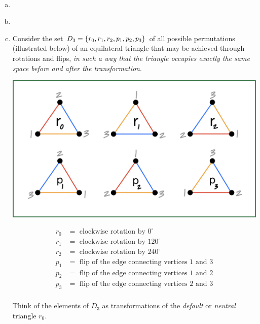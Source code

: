 \documentclass[11pt,fleqn,dvipsnames,usenames]{article}
\newcommand{\p}{\noindent}
\begin{document}
\begin{examples*}~
\begin{enumerate}[(a)]
\item ~
\vspace{3cm}

\item~
\vspace{3cm}

\item Consider the set $D_3 = \left\{r_0,r_1,r_2,p_1,p_2,p_3\right\}$ of all possible permutations (illustrated below) of an equilateral triangle that may be achieved through rotations and flips, \emph{in such a way that the triangle occupies exactly the same space before and after the transformation}.

\begin{multicols}{2}
\begin{center}
\includegraphics[width=1\linewidth]{permutationsoftriangle}
\end{center}
\columnbreak

\begin{align*}
r_0 &= \text{ clockwise rotation by }0^{\circ}\\
r_1 &= \text{ clockwise rotation by }120^{\circ}\\
r_2 &= \text{ clockwise rotation by }240^{\circ}\\
p_1 &= \text{ flip of the edge connecting vertices }1\text{ and }3\\
p_2 &= \text{ flip of the edge connecting vertices }1\text{ and }2\\
p_3 &= \text{ flip of the edge connecting vertices }2\text{ and }3\\
\end{align*}
\end{multicols}

\p Think of the elements of $D_3$ as transformations of the \emph{default} or \emph{neutral} triangle $r_{0}$.
\newpage


\end{enumerate}
\end{examples*}
\end{document}
